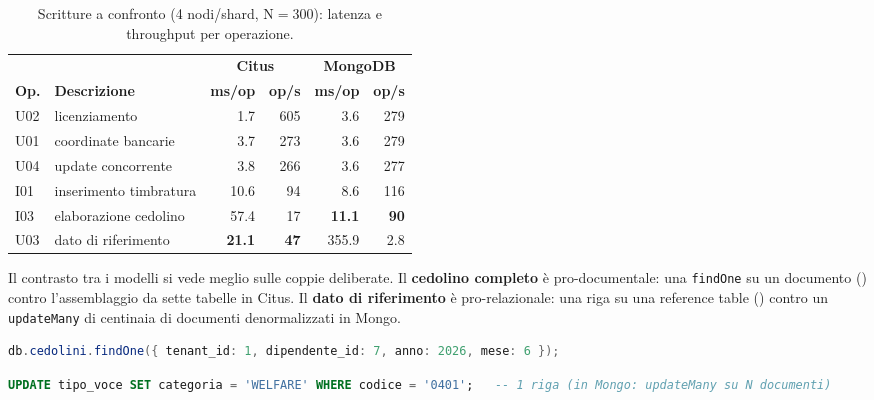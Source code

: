 \begin{table}[htbp]
  \centering
  \caption{Scritture a confronto (4 nodi/shard, N${=}300$): latenza e throughput per operazione.}
  \label{tab:confronto-scritture}
  \begin{tabular}{llrrrr}
    \toprule
    & & \multicolumn{2}{c}{\textbf{Citus}} & \multicolumn{2}{c}{\textbf{MongoDB}} \\
    \cmidrule(lr){3-4}\cmidrule(lr){5-6}
    \textbf{Op.} & \textbf{Descrizione} & \textbf{ms/op} & \textbf{op/s} & \textbf{ms/op} & \textbf{op/s} \\
    \midrule
    U02 & licenziamento          & 1.7  & 605 & 3.6   & 279 \\
    U01 & coordinate bancarie    & 3.7  & 273 & 3.6   & 279 \\
    U04 & update concorrente     & 3.8  & 266 & 3.6   & 277 \\
    I01 & inserimento timbratura & 10.6 & 94  & 8.6   & 116 \\
    I03 & elaborazione cedolino  & 57.4 & 17  & \textbf{11.1}  & \textbf{90} \\
    U03 & dato di riferimento    & \textbf{21.1} & \textbf{47} & 355.9 & 2.8 \\
    \bottomrule
  \end{tabular}
\end{table}

Il contrasto tra i modelli si vede meglio sulle coppie deliberate. Il \textbf{cedolino completo} è
pro-documentale: una \texttt{findOne} su un documento () contro l'assemblaggio da sette
tabelle in Citus. Il \textbf{dato di riferimento} è pro-relazionale: una riga su una reference table
() contro un \texttt{updateMany} di centinaia di documenti denormalizzati in Mongo.

\begin{lstlisting}[style=sobrio, language=Java, caption={Cedolino completo in MongoDB: un solo documento (pro-documentale).}, label={lst:l10-mongo}]
db.cedolini.findOne({ tenant_id: 1, dipendente_id: 7, anno: 2026, mese: 6 });
\end{lstlisting}

\begin{lstlisting}[style=sobrio, language=SQL, caption={Modifica di un dato di riferimento in Citus: una riga (pro-relazionale).}, label={lst:u03-citus}]
UPDATE tipo_voce SET categoria = 'WELFARE' WHERE codice = '0401';   -- 1 riga (in Mongo: updateMany su N documenti)
\end{lstlisting}
